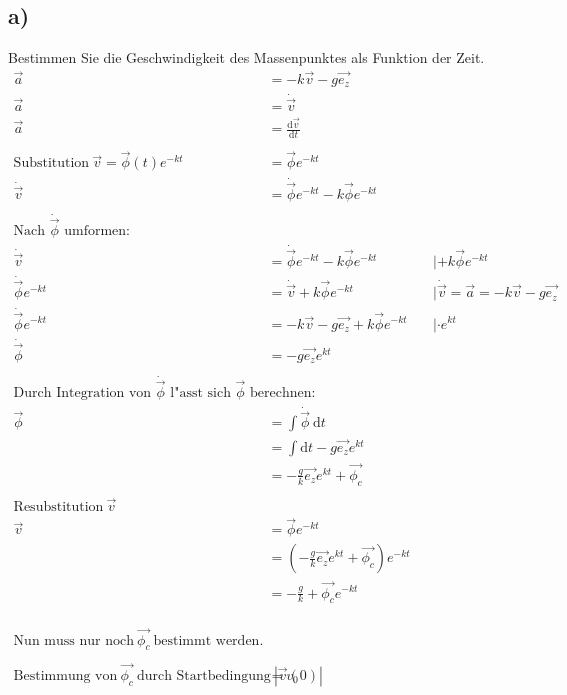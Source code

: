 \documentclass{theozettel}
\begin{document}
\subsection*{a)} Bestimmen Sie die Geschwindigkeit des Massenpunktes als Funktion der Zeit.
\begingroup
\allowdisplaybreaks
\begin{align*}
\vec{a}&=-k\vec{v}-g\vec{e_z}\\
\vec{a}&=\dot{\vec{v}}\\
\vec{a}&=\frac{\text{d}\vec{v}}{\text{d}t}\\\\
\text{Substitution} \ \vec{v}=\vec{\phi}\left(t\right)e^{-kt}&=\vec{\phi}e^{-kt}\\
\dot{\vec{v}}&=\dot{\vec{\phi}}e^{-kt}-k\vec{\phi}e^{-kt}\\\\
\text{Nach }\dot{\vec{\phi}}\text{ umformen:}\\
\dot{\vec{v}}&=\dot{\vec{\phi}}e^{-kt}-k\vec{\phi}e^{-kt}&&|+k\vec{\phi}e^{-kt}\\
\dot{\vec{\phi}}e^{-kt}&=\dot{\vec{v}}+k\vec{\phi}e^{-kt}&&|\dot{\vec{v}}=\vec{a}=-k\vec{v}-g\vec{e_z}\\
\dot{\vec{\phi}}e^{-kt}&=-k\vec{v}-g\vec{e_z}+k\vec{\phi}e^{-kt}&&|\cdot e^{kt}\\
\dot{\vec{\phi}}&=-g\vec{e_z}e^{kt}\\\\
\text{Durch Integration von }\dot{\vec{\phi}}\text{ l"asst sich }\vec{\phi}\text{ berechnen:}\\
\vec{\phi}&=\int\dot{\vec{\phi}} \ \text{d}t\\
&=\int\text{d}t-g\vec{e_z}e^{kt}\\
&=-\frac{g}{k}\vec{e_z}e^{kt}+\vec{\phi_c}\\\\
\text{Resubstitution} \ \vec{v}\\
\vec{v}&=\vec{\phi}e^{-kt}\\
&=\left(-\frac{g}{k}\vec{e_z}e^{kt}+\vec{\phi_c}\right)e^{-kt}\\
&=-\frac{g}{k}+\vec{\phi_c}e^{-kt}\\\\\\\\
\text{Nun muss nur noch} \ \vec{\phi_c} \ \text{bestimmt werden.}\\\\
\text{Bestimmung von} \ \vec{\phi_c} \ \text{durch Startbedingung} \ \left|\vec{v}\left(0\right)\right|&=v_0\\

\end{align*}
\end{document}

